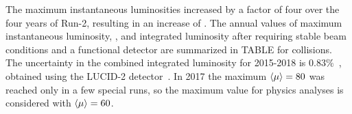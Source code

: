 The maximum instantaneous luminosities increased by a factor of four over the four years of Run-2, resulting in an increase of \avgmu. The annual values of maximum instantaneous luminosity, \avgmu, and integrated luminosity after requiring stable beam conditions and a functional detector are summarized in TABLE for \pp collisions. The uncertainty in the combined integrated luminosity for 2015-2018 is \(0.83\%\)~\cite{ATLASLumiRun2}, obtained using the LUCID-2 detector~\cite{LUCID2}. In 2017 the maximum \(\langle \mu \rangle=80\) was reached only in a few special runs, so the maximum value for physics analyses is considered with \(\langle \mu \rangle=60\).

























































































































